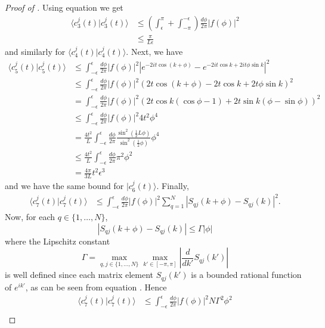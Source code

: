 \documentclass[../thesis-main/thesis-main]{subfiles}
\begin{document}
\begin{proof}[Proof of {}]
Using equation  we get 
\begin{align*}
\langle c_{3}^{j}(t)|c_{3}^{j}(t)\rangle & \leq \left(\int_{\epsilon}^{\pi}+\int_{-\pi}^{-\epsilon}\right)\frac{d\phi}{2\pi}\left|f(\phi)\right|^{2}\\
 & \leq \frac{\pi}{L\epsilon}\end{align*}
and similarly for $\langle c_{4}^{j}(t)|c_{4}^{j}(t)\rangle$.
Next, we have
\begin{align*}
\langle c_{5}^{j}(t)|c_{5}^{j}(t)\rangle & \leq \int_{-\epsilon}^{\epsilon}\frac{d\phi}{2\pi}\left|f(\phi)\right|^{2}\left|e^{-2it\cos\left(k+\phi\right)}-e^{-2it\cos k+2it\phi\sin k}\right|^{2}\\
 & \leq \int_{-\epsilon}^{\epsilon}\frac{d\phi}{2\pi}\left|f(\phi)\right|^{2}\left(2t\cos\left(k+\phi\right)-2t\cos k+2t\phi\sin k\right)^{2}\\
 & = \int_{-\epsilon}^{\epsilon}\frac{d\phi}{2\pi}\left|f(\phi)\right|^{2}\left(2t\cos k\left(\cos\phi-1\right)+2t\sin k\left(\phi-\sin\phi\right)\right)^{2}\\
 & \leq \int_{-\epsilon}^{\epsilon}\frac{d\phi}{2\pi}\left|f(\phi)\right|^{2}4t^{2}\phi^{4}\\
 & = \frac{4t^{2}}{L}\int_{-\epsilon}^{\epsilon}\frac{d\phi}{2\pi}\frac{\sin^{2}(\frac{1}{2}L\phi)}{\sin^{2}(\frac{1}{2}\phi)}\phi^{4}\\
 & \leq \frac{4t^{2}}{L}\int_{-\epsilon}^{\epsilon}\frac{d\phi}{2\pi}\pi^{2}\phi^{2}\\
 & = \frac{4\pi}{3L}t^{2}\epsilon^{3}\end{align*}
 and we have the same bound for $|c_{6}^{j}(t)\rangle$. Finally, 
\begin{align*}
\langle c_{7}^{j}(t)|c_{7}^{j}(t)\rangle & \leq \int_{-\epsilon}^{\epsilon}\frac{d\phi}{2\pi}\left|f(\phi)\right|^{2}\sum_{q=1}^{N}\left|S_{qj}(k+\phi)-S_{qj}(k)\right|^{2}.\end{align*}
Now, for each $q\in\{1,\ldots,N\}$,
\[
\left|S_{qj}(k+\phi)-S_{qj}(k)\right| \leq \Gamma |\phi|
\]
where the Lipschitz constant
\[
\Gamma = \max_{q,j\in\{1,\ldots,N\}} \max_{k' \in [-\pi,\pi]}\left|\frac{d}{dk'}S_{qj}(k')\right|
\]
is well defined since each matrix element $S_{qj}(k')$ is a
bounded rational function of $e^{ik'}$, as can be seen from equation . Hence
\begin{align*}
\langle c_{7}^{j}(t)|c_{7}^{j}(t)\rangle & \leq \int_{-\epsilon}^{\epsilon}\frac{d\phi}{2\pi}\left|f(\phi)\right|^{2}N\Gamma^{2}\phi^{2}\\

\end{align*}
\end{proof}
\end{document}
